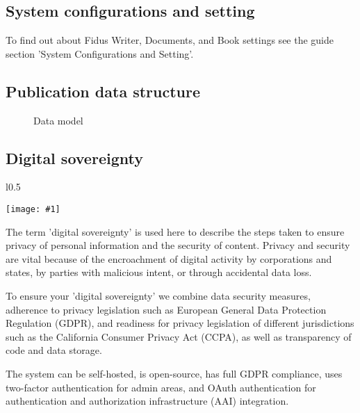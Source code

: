 \documentclass{article}
\newlength{\imgwidth}
\newcommand\scaledgraphics[2]{%
                
\settowidth{\imgwidth}{\texttt{[image: \#1]}}%
                
\setlength{\imgwidth}{\minof{\imgwidth}{#2\textwidth}}%
                
\texttt{[image: \#1]}%
                
}
\begin{document}
\subsection{System configurations and setting}\label{H4870876}



To find out about Fidus Writer, Documents, and Book settings see the guide section 'System Configurations and Setting'.


\subsection{Publication data structure}\label{H4820656}


\begin{figure}

\caption*{Data model}\label{F86281041}
\end{figure}


\subsection{Digital sovereignty}\label{H6425485}


\begin{wrapfigure}{l}{0.5\textwidth}
\scaledgraphics{60a0cd01-c4e1-467e-a517-a5ae77dbbbaf.png}{0.5}
\label{F43863211}
\end{wrapfigure}


The term 'digital sovereignty' is used here to describe the steps taken to ensure privacy of personal information and the security of content. Privacy and security are vital because of the encroachment of digital activity by corporations and states, by parties with malicious intent, or through accidental data loss.


To ensure your 'digital sovereignty' we combine data security measures, adherence to privacy legislation such as European General Data Protection Regulation (GDPR), and readiness for privacy legislation of different jurisdictions such as the California Consumer Privacy Act (CCPA), as well as transparency of code and data storage.


The system can be self-hosted, is open-source, has full GDPR compliance, uses two-factor authentication for admin areas, and OAuth authentication for authentication and authorization infrastructure (AAI) integration. 
\end{document}
